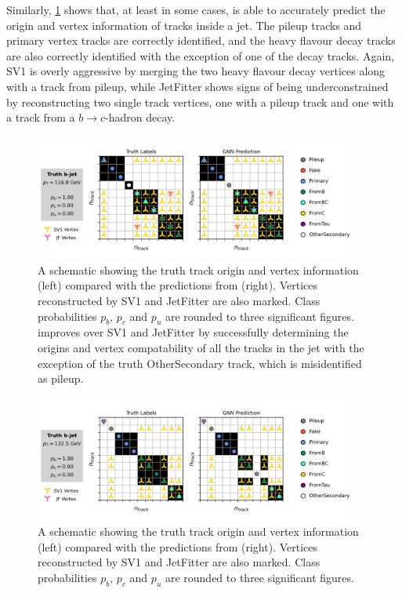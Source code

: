 Similarly, \cref{fig:bjet_diag_1} shows that, at least in some cases, \GNN is able to accurately predict the origin and vertex information of tracks inside a jet.
The pileup tracks and primary vertex tracks are correctly identified, and the heavy flavour decay tracks are also correctly identified with the exception of one of the \bhadron decay tracks.
Again, SV1 is overly aggressive by merging the two heavy flavour decay vertices along with a track from pileup, while JetFitter shows signs of being underconstrained by reconstructing two single track vertices, one with a pileup track and one with a track from a $b\rightarrow c$-hadron decay.

\begin{figure}[!p]
    \centering
    \includegraphics[width=0.95\textwidth]{chapters/gnn_tagger/figs/bjet_vertex.pdf}
    \caption{
        A schematic showing the truth track origin and vertex information (left) compared with the predictions from \GNN (right).
        Vertices reconstructed by SV1 and JetFitter are also marked.
        Class probabilities $p_b$, $p_c$ and $p_u$ are rounded to three significant figures.
        \GNN improves over SV1 and JetFitter by successfully determining the origins and vertex compatability of all the tracks in the jet with the exception of the truth OtherSecondary track, which is misidentified as pileup.
    }
    \label{fig:bjet_diag_1}
 \end{figure}

 \begin{figure}[!p]
    \centering
    \includegraphics[width=0.95\textwidth]{chapters/gnn_tagger/figs/bjet_vertex2.pdf}
    \caption{
        A schematic showing the truth track origin and vertex information (left) compared with the predictions from \GNN (right).
        Vertices reconstructed by SV1 and JetFitter are also marked.
        Class probabilities $p_b$, $p_c$ and $p_u$ are rounded to three significant figures.
    }
    \label{fig:bjet_diag_2}
 \end{figure}

